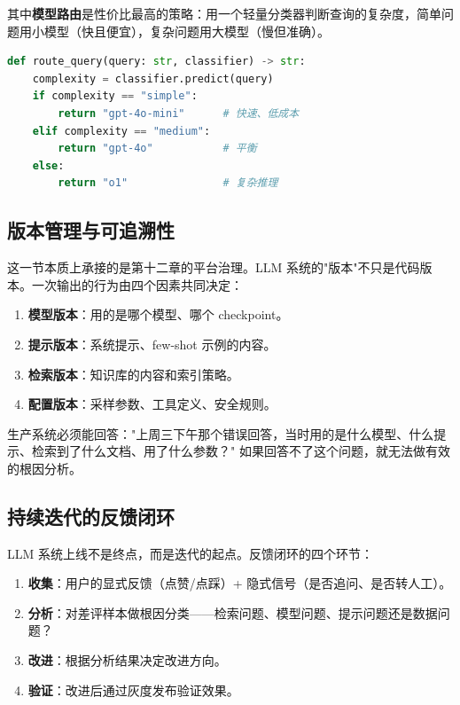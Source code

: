 其中\textbf{模型路由}是性价比最高的策略：用一个轻量分类器判断查询的复杂度，简单问题用小模型（快且便宜），复杂问题用大模型（慢但准确）。

\begin{lstlisting}[language=Python]
def route_query(query: str, classifier) -> str:
    complexity = classifier.predict(query)
    if complexity == "simple":
        return "gpt-4o-mini"      # 快速、低成本
    elif complexity == "medium":
        return "gpt-4o"           # 平衡
    else:
        return "o1"               # 复杂推理
\end{lstlisting}

\subsection{版本管理与可追溯性}
这一节本质上承接的是第十二章的平台治理。LLM 系统的"版本"不只是代码版本。一次输出的行为由四个因素共同决定：

\begin{enumerate}
  \item \textbf{模型版本}：用的是哪个模型、哪个 checkpoint。
  \item \textbf{提示版本}：系统提示、few-shot 示例的内容。
  \item \textbf{检索版本}：知识库的内容和索引策略。
  \item \textbf{配置版本}：采样参数、工具定义、安全规则。
\end{enumerate}

生产系统必须能回答："上周三下午那个错误回答，当时用的是什么模型、什么提示、检索到了什么文档、用了什么参数？" 如果回答不了这个问题，就无法做有效的根因分析。

\subsection{持续迭代的反馈闭环}
LLM 系统上线不是终点，而是迭代的起点。反馈闭环的四个环节：

\begin{enumerate}
  \item \textbf{收集}：用户的显式反馈（点赞/点踩）+ 隐式信号（是否追问、是否转人工）。
  \item \textbf{分析}：对差评样本做根因分类——检索问题、模型问题、提示问题还是数据问题？
  \item \textbf{改进}：根据分析结果决定改进方向。
  \item \textbf{验证}：改进后通过灰度发布验证效果。
\end{enumerate}

